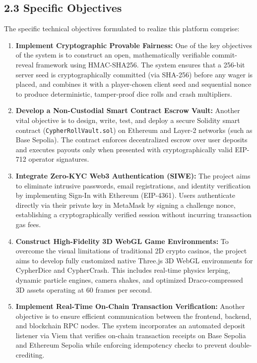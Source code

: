 \subsection*{2.3 Specific Objectives}
The specific technical objectives formulated to realize this platform comprise:
\begin{enumerate}[leftmargin=1.5em]
    \item \textbf{Implement Cryptographic Provable Fairness:} One of the key objectives of the system is to construct an open, mathematically verifiable commit-reveal framework using HMAC-SHA256. The system ensures that a 256-bit server seed is cryptographically committed (via SHA-256) before any wager is placed, and combines it with a player-chosen client seed and sequential nonce to produce deterministic, tamper-proof dice rolls and crash multipliers.
    
    \item \textbf{Develop a Non-Custodial Smart Contract Escrow Vault:} Another vital objective is to design, write, test, and deploy a secure Solidity smart contract (\texttt{CypherRollVault.sol}) on Ethereum and Layer-2 networks (such as Base Sepolia). The contract enforces decentralized escrow over user deposits and executes payouts only when presented with cryptographically valid EIP-712 operator signatures.
    
    \item \textbf{Integrate Zero-KYC Web3 Authentication (SIWE):} The project aims to eliminate intrusive passwords, email registrations, and identity verification by implementing Sign-In with Ethereum (EIP-4361). Users authenticate directly via their private key in MetaMask by signing a challenge nonce, establishing a cryptographically verified session without incurring transaction gas fees.
    
    \item \textbf{Construct High-Fidelity 3D WebGL Game Environments:} To overcome the visual limitations of traditional 2D crypto casinos, the project aims to develop fully customized native Three.js 3D WebGL environments for CypherDice and CypherCrash. This includes real-time physics lerping, dynamic particle engines, camera shakes, and optimized Draco-compressed 3D assets operating at 60 frames per second.
    
    \item \textbf{Implement Real-Time On-Chain Transaction Verification:} Another objective is to ensure efficient communication between the frontend, backend, and blockchain RPC nodes. The system incorporates an automated deposit listener via Viem that verifies on-chain transaction receipts on Base Sepolia and Ethereum Sepolia while enforcing idempotency checks to prevent double-crediting.
    

\end{enumerate}
